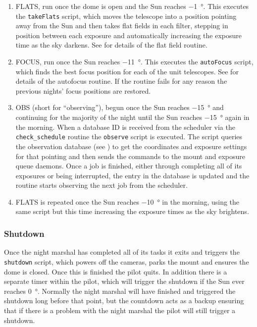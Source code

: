 \begin{colsection}
\begin{colsection}
\begin{enumerate}
\item FLATS, run once the dome is open and the Sun reaches \SI{-1}{\degree}. This executes the \texttt{takeFlats} script, which moves the telescope into a position pointing away from the Sun and then takes flat fields in each filter, stepping in position between each exposure and automatically increasing the exposure time as the sky darkens. See  for details of the flat field routine.

\item FOCUS, run once the Sun reaches \SI{-11}{\degree}. This executes the \texttt{autoFocus} script, which finds the best focus position for each of the unit telescopes. See  for details of the autofocus routine. If the routine fails for any reason the previous nights' focus positions are restored.

\item OBS (short for ``observing''), begun once the Sun reaches \SI{-15}{\degree} and continuing for the majority of the night until the Sun reaches \SI{-15}{\degree} again in the morning. When a database ID is received from the scheduler via the \texttt{check\_schedule} routine the \texttt{observe} script is executed. The script queries the observation database (see ) to get the coordinates and exposure settings for that pointing and then sends the commands to the mount and exposure queue daemons. Once a job is finished, either through completing all of its exposures or being interrupted, the entry in the database is updated and the routine starts observing the next job from the scheduler.

\item FLATS is repeated once the Sun reaches \SI{-10}{\degree} in the morning, using the same script but this time increasing the exposure times as the sky brightens.

\end{enumerate}

\subsubsection{Shutdown}

Once the night marshal has completed all of its tasks it exits and triggers the \texttt{shutdown} script, which powers off the cameras, parks the mount and ensures the dome is closed. Once this is finished the pilot quits. In addition there is a separate  timer within the pilot, which will trigger the shutdown if the Sun ever reaches \SI{0}{\degree}. Normally the night marshal will have finished and triggered the shutdown long before that point, but the countdown acts as a backup ensuring that if there is a problem with the night marshal the pilot will still trigger a shutdown.


\end{colsection}
\end{colsection}
